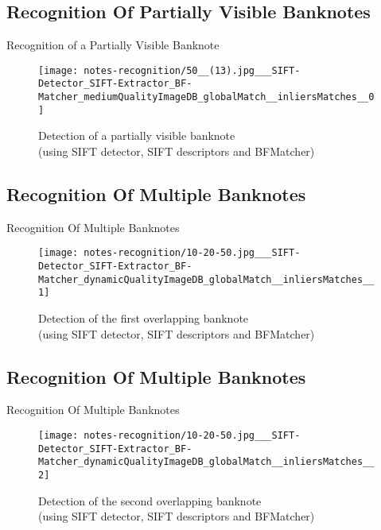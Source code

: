 \subsection*{Recognition Of Partially Visible Banknotes}
\begin{frame}{Recognition of a Partially Visible Banknote}
	\begin{figure}[H]
		\centering
		\texttt{[image: notes-recognition/50\_\_(13).jpg\_\_\_SIFT-Detector\_SIFT-Extractor\_BF-Matcher\_mediumQualityImageDB\_globalMatch\_\_inliersMatches\_\_0]}
		\caption{Detection of a partially visible banknote\\(using SIFT detector, SIFT descriptors and BFMatcher)}
		\label{fig:recognition-partially-visible}
	\end{figure}
\end{frame}


\subsection*{Recognition Of Multiple Banknotes}
\begin{frame}{Recognition Of Multiple Banknotes}
	\begin{figure}[H]
		\centering
		\texttt{[image: notes-recognition/10-20-50.jpg\_\_\_SIFT-Detector\_SIFT-Extractor\_BF-Matcher\_dynamicQualityImageDB\_globalMatch\_\_inliersMatches\_\_1]}
		\caption{Detection of the first overlapping banknote\\(using SIFT detector, SIFT descriptors and BFMatcher)}
		\label{fig:recognition-overlapping-banknotes-1}
	\end{figure}
\end{frame}

\subsection*{Recognition Of Multiple Banknotes}
\begin{frame}{Recognition Of Multiple Banknotes}
	\begin{figure}[H]
		\centering
		\texttt{[image: notes-recognition/10-20-50.jpg\_\_\_SIFT-Detector\_SIFT-Extractor\_BF-Matcher\_dynamicQualityImageDB\_globalMatch\_\_inliersMatches\_\_2]}
		\caption{Detection of the second overlapping banknote\\(using SIFT detector, SIFT descriptors and BFMatcher)}
		\label{fig:recognition-overlapping-banknotes-2}
	\end{figure}
\end{frame}

